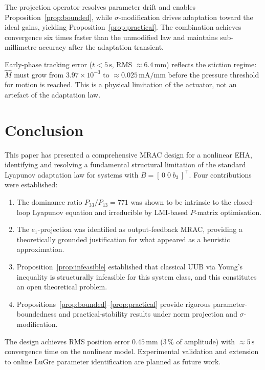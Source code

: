 \documentclass[12pt,a4paper]{article}
\theoremstyle{plain}
\theoremstyle{definition}
\theoremstyle{remark}
\newcommand{\Mh}{\hat{M}}       %
\begin{document}
The projection operator resolves parameter drift and enables Proposition~\ref{prop:bounded}, while $\sigma$-modification drives adaptation toward the ideal gains, yielding Proposition~\ref{prop:practical}.  The combination achieves convergence six times faster than the unmodified law and maintains sub-millimetre accuracy after the adaptation transient.

Early-phase tracking error ($t<5\,\mathrm{s}$, RMS $\approx6.4\,\mathrm{mm}$)
reflects the stiction regime: $\Mh$ must grow from
$3.97\times10^{-3}$ to $\approx0.025\,\mathrm{mA/mm}$ before the
pressure threshold for motion is reached.  This is a physical limitation of
the actuator, not an artefact of the adaptation law.

\section{Conclusion}
\label{sec:conclusion}

This paper has presented a comprehensive MRAC design for a nonlinear
EHA, identifying and resolving a fundamental structural limitation of
the standard Lyapunov adaptation law for systems with
$B=[\,0\;0\;b_3\,]^\top$.  Four contributions were established:
\begin{enumerate}
  \item The dominance ratio $P_{33}/P_{13}=771$ was shown to be
    intrinsic to the closed-loop Lyapunov equation and irreducible
    by LMI-based $P$-matrix optimisation.
  \item The $e_1$-projection was identified as output-feedback MRAC,
    providing a theoretically grounded justification for what
    appeared as a heuristic approximation.
  \item Proposition~\ref{prop:infeasible} established that classical
    UUB via Young's inequality is structurally infeasible for this
    system class, and this constitutes an open theoretical problem.
  \item Propositions~\ref{prop:bounded}--\ref{prop:practical}
    provide rigorous parameter-boundedness and practical-stability
    results under norm projection and $\sigma$-modification.
\end{enumerate}

The design achieves RMS position error $0.45\,\mathrm{mm}$
($3\,\%$ of amplitude) with $\approx5\,\mathrm{s}$ convergence time
on the nonlinear model.  Experimental validation and extension to
online LuGre parameter identification are planned as future work.
\end{document}
